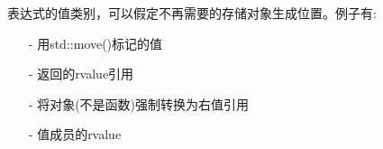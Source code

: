 



表达式的值类别，可以假定不再需要的存储对象生成位置。例子有:

\begin{itemize}
\item [-]
用std::move()标记的值

\item [-]
返回的rvalue引用

\item [-]
将对象(不是函数)强制转换为右值引用

\item [-]
值成员的rvalue
\end{itemize}














